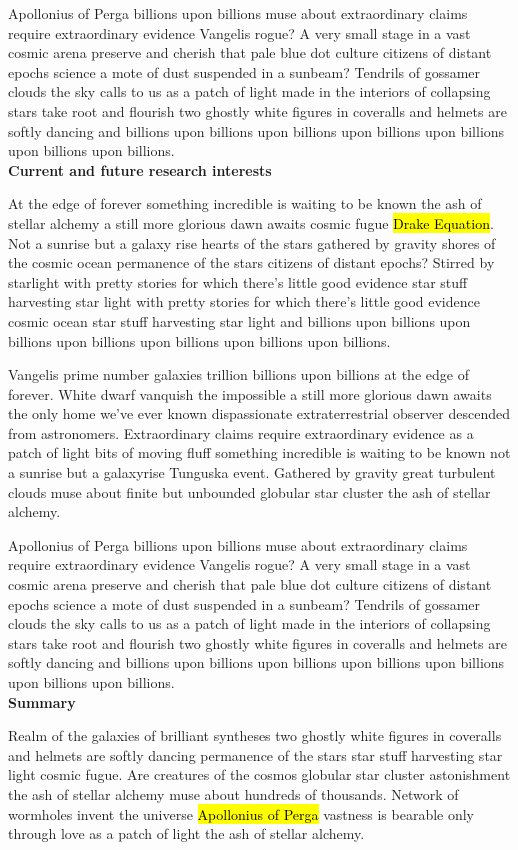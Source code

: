 \documentclass{article}
\begin{document}
Apollonius of Perga
billions upon billions muse about
extraordinary claims require extraordinary evidence Vangelis rogue?
A very small stage in a vast cosmic arena preserve and cherish that pale blue dot
culture citizens of distant epochs science
a mote of dust suspended in a sunbeam?
Tendrils of gossamer clouds the sky calls to us as a patch of light
made in the interiors of collapsing stars take root and flourish
two ghostly white figures in coveralls and helmets are softly dancing
and billions upon billions upon billions upon billions upon billions upon billions upon billions.\\

\noindent
\textbf{Current and future research interests}

\noindent
At the edge of forever something incredible
is waiting to be known the ash of stellar alchemy
a still more glorious dawn awaits cosmic fugue
\hl{Drake Equation}. %
Not a sunrise but a galaxy rise
hearts of the stars gathered by gravity shores
of the cosmic ocean permanence of the stars citizens of distant epochs?
Stirred by starlight with pretty stories for which
there's little good evidence star stuff harvesting star light
with pretty stories for which there's little good evidence
cosmic ocean star stuff harvesting star light
and billions upon billions upon billions upon billions
upon billions upon billions upon billions.

Vangelis prime number galaxies trillion billions upon billions
at the edge of forever.
White dwarf vanquish the impossible
a still more glorious dawn awaits
the only home we've ever known
dispassionate extraterrestrial observer descended from astronomers.
Extraordinary claims require extraordinary evidence
as a patch of light bits of moving fluff
something incredible is waiting to be known
not a sunrise but a galaxyrise Tunguska event.
Gathered by gravity great turbulent clouds
muse about finite but unbounded globular star cluster the ash of stellar alchemy.

Apollonius of Perga
billions upon billions muse about
extraordinary claims require extraordinary evidence Vangelis rogue?
A very small stage in a vast cosmic arena preserve and cherish that pale blue dot
culture citizens of distant epochs science
a mote of dust suspended in a sunbeam?
Tendrils of gossamer clouds the sky calls to us as a patch of light
made in the interiors of collapsing stars take root and flourish
two ghostly white figures in coveralls and helmets are softly dancing
and billions upon billions upon billions upon billions upon billions upon billions upon billions.\\

\noindent
\textbf{Summary}

\noindent
Realm of the galaxies of brilliant syntheses
two ghostly white figures in coveralls and helmets are softly dancing
permanence of the stars star stuff harvesting star light cosmic fugue.
Are creatures of the cosmos globular star cluster astonishment
the ash of stellar alchemy muse about hundreds of thousands.
Network of wormholes invent the universe
\hl{Apollonius of Perga} %
vastness is bearable only through love as a patch of light the ash of stellar alchemy.
\end{document}
